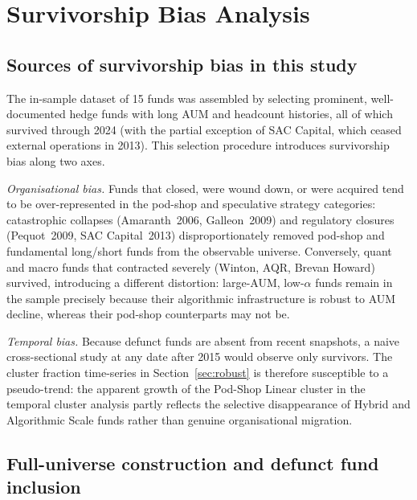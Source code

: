 
\FloatBarrier

\section{\label{sec:survivorship}Survivorship Bias Analysis}

\subsection{Sources of survivorship bias in this study}

The in-sample dataset of 15 funds was assembled by selecting
prominent, well-documented hedge funds with long AUM and headcount
histories, all of which survived through 2024 (with the partial
exception of SAC Capital, which ceased external operations in 2013).
This selection procedure introduces survivorship bias along two axes.

\textit{Organisational bias.}
Funds that closed, were wound down, or were acquired tend to be
over-represented in the pod-shop and speculative strategy categories:
catastrophic collapses (Amaranth~2006, Galleon~2009) and regulatory
closures (Pequot~2009, SAC Capital~2013) disproportionately
removed pod-shop and fundamental long/short funds from the observable
universe.
Conversely, quant and macro funds that contracted severely
(Winton, AQR, Brevan Howard) survived, introducing a
different distortion: large-AUM, low-$\alpha$ funds remain in the
sample precisely because their algorithmic infrastructure is robust
to AUM decline, whereas their pod-shop counterparts may not be.

\textit{Temporal bias.}
Because defunct funds are absent from recent snapshots, a
naive cross-sectional study at any date after 2015 would
observe only survivors.
The cluster fraction time-series in Section~\ref{sec:robust}
is therefore susceptible to a pseudo-trend: the apparent growth
of the Pod-Shop Linear cluster in the temporal cluster analysis
partly reflects the selective disappearance of Hybrid and Algorithmic
Scale funds rather than genuine organisational migration.

\subsection{Full-universe construction and defunct fund inclusion}

